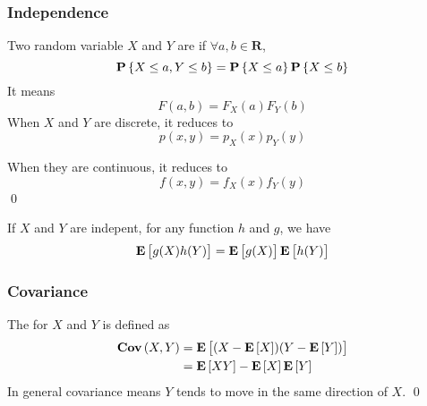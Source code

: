 \subsubsection{Independence}

\begin{definition}
    Two random variable $X$ and $Y$ are  if $\forall a,b \in \mathbf{R}$,
    \begin{equation}
        \mathop{\bf P\/}\left\{ X \leq a , Y \leq b \right\} = \mathop{\bf P\/}\left\{ X \leq a \right\} \mathop{\bf P\/}\left\{ X \leq b \right\}
    \end{equation}
    It means
    \begin{equation}
        F(a,b) = F_X(a) F_Y(b)
    \end{equation}
    When $X$ and $Y$ are discrete, it reduces to
    \begin{equation}
        p(x,y) = p_X(x) p_Y(y)
    \end{equation}
    
    When they are continuous, it reduces to
    \begin{equation}
        f(x,y)=f_X(x) f_Y(y)
    \end{equation}
    \qed
\end{definition}

\begin{theorem}
    If $X$ and $Y$ are indepent, for any function $h$ and $g$, we have
    \begin{equation}
        \mathop{\bf E\/} \left[ g(X) h(Y) \right] = \mathop{\bf E\/} \left[ g(X) \right] \mathop{\bf E\/} \left[ h(Y) \right]
    \end{equation}    
\end{theorem}

\subsubsection{Covariance}

\begin{definition}[covariance]
    The  for $X$ and $Y$ is defined as 
    \begin{equation}
    \begin{aligned}
        \mathop{\bf Cov\/}\left(X,Y \right) &= \mathop{\bf E\/} \left[ (X - \mathop{\bf E\/} \left[ X \right])(Y - \mathop{\bf E\/} \left[ Y \right]) \right] \\
        &= \mathop{\bf E\/} \left[ XY \right] - \mathop{\bf E\/} \left[ X \right] \mathop{\bf E\/} \left[ Y \right]
    \end{aligned}
    \end{equation}
    In general covariance means $Y$ tends to move in the same direction of $X$.
    \qed
\end{definition}


